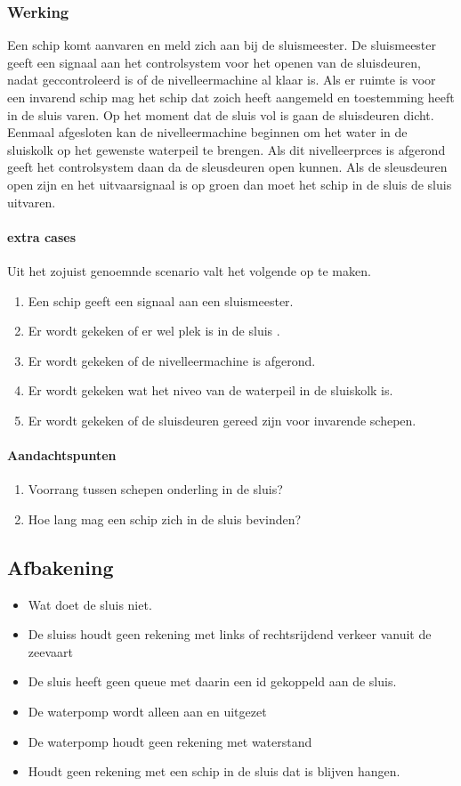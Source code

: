 {{{{{{{{{\subsubsection{Werking}

Een schip komt aanvaren en meld zich aan bij de sluismeester. De sluismeester geeft een signaal aan het controlsystem voor het openen van de sluisdeuren, nadat geccontroleerd is of de nivelleermachine al klaar is. Als er ruimte is voor een invarend schip mag het schip dat zoich heeft aangemeld en toestemming heeft  in de sluis varen. Op het moment dat de sluis vol is gaan de sluisdeuren dicht. Eenmaal afgesloten kan de nivelleermachine beginnen om het water in de sluiskolk op het gewenste waterpeil te brengen. Als dit nivelleerprces is afgerond geeft  het controlsystem daan da de sleusdeuren open kunnen.  Als de sleusdeuren open zijn en het uitvaarsignaal is op groen dan moet het schip in de sluis de sluis uitvaren.
\paragraph{extra cases}
Uit het zojuist genoemnde scenario valt het volgende op te maken.
\begin{enumerate}
\item Een schip geeft een signaal aan een sluismeester.
\item Er wordt gekeken of er wel plek is in de sluis .
\item Er wordt gekeken of de nivelleermachine is afgerond.
\item Er wordt gekeken wat het niveo van de waterpeil in de sluiskolk is.
\item Er wordt gekeken of de sluisdeuren gereed zijn voor invarende schepen.
\end{enumerate}
\paragraph{Aandachtspunten}
\begin{enumerate}
\item Voorrang tussen schepen onderling in de sluis?
\item Hoe lang mag een schip zich in de sluis bevinden?
\end{enumerate} 




\subsection{Afbakening}
\begin{itemize}
\item Wat doet de sluis niet.
\item De sluiss houdt geen rekening met links of rechtsrijdend verkeer vanuit de zeevaart
\item De sluis heeft geen queue met daarin een id gekoppeld aan de sluis.
\item De waterpomp wordt alleen aan en uitgezet
\item De waterpomp houdt geen rekening met waterstand
\item Houdt geen rekening met een schip in de sluis dat is blijven hangen.


\end{itemize}}}}}}}}}}
